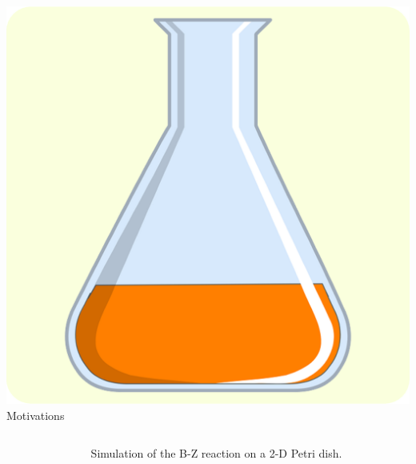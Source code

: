 \documentclass[serif,mathserif]{beamer}
\begin{document}
\begin{frame}{\includegraphics[height=0.06\textheight]{erlenmeyer.eps}\hspace{0.25cm} Motivations}
    \begin{columns}[t]
        \begin{column}{.6\textwidth}
            \centering
        \end{column}
        \begin{column}{.4\textwidth}
            \centering
            Simulation of the B-Z reaction on a 2-D Petri dish.
        \end{column}
    \end{columns}
\end{frame}
\end{document}

